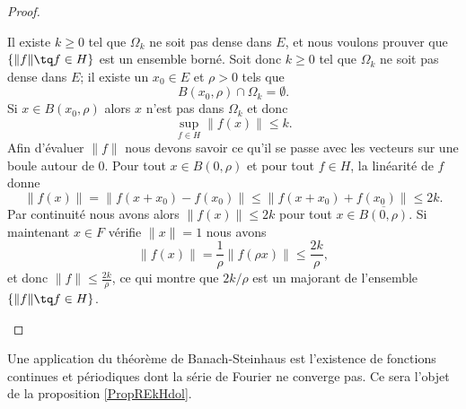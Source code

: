 \begin{proof}
\begin{subproof}
            Il existe \( k\geq 0\) tel que \( \Omega_k\) ne soit pas dense dans \( E\), et nous voulons prouver que \( \{ \| f \|\tq f\in H \}\) est un ensemble borné. Soit donc \( k\geq 0\) tel que \( \Omega_k\) ne soit pas dense dans \( E\); il existe un \( x_0\in E\) et \( \rho>0\) tels que
            \begin{equation}
                B(x_0,\rho)\cap \Omega_k=\emptyset.
            \end{equation}
            Si \( x\in B(x_0,\rho)\) alors \( x\) n'est pas dans \( \Omega_k\) et donc
            \begin{equation}
                \sup_{f\in H}\| f(x) \|\leq k.
            \end{equation}
            Afin d'évaluer \( \| f \|\) nous devons savoir ce qu'il se passe avec les vecteurs sur une boule autour de \( 0\). Pour tout \( x\in B(0,\rho)\) et pour tout \( f\in H\), la linéarité de \( f\) donne
            \begin{equation}
                \| f(x) \|=\| f(x+x_0)-f(x_0) \|\leq \| f(x+x_0)+f(x_0) \|\leq 2k.
            \end{equation}
            Par continuité nous avons alors \( \| f(x) \|\leq 2k\) pour tout \( x\in \overline{ B(0,\rho) }\). Si maintenant \( x\in F\) vérifie \( \| x \|=1\) nous avons
            \begin{equation}
                \| f(x) \|=\frac{1}{ \rho }\| f(\rho x) \|\leq \frac{ 2k }{ \rho },
            \end{equation}
            et donc \( \| f \|\leq \frac{ 2k }{ \rho }\), ce qui montre que \( 2k/\rho\) est un majorant de l'ensemble \( \{ \| f \|\tq f\in H \}\).

    \end{subproof}

\end{proof}
Une application du théorème de Banach-Steinhaus est l'existence de fonctions continues et périodiques dont la série de Fourier ne converge pas. Ce sera l'objet de la proposition \ref{PropREkHdol}.

